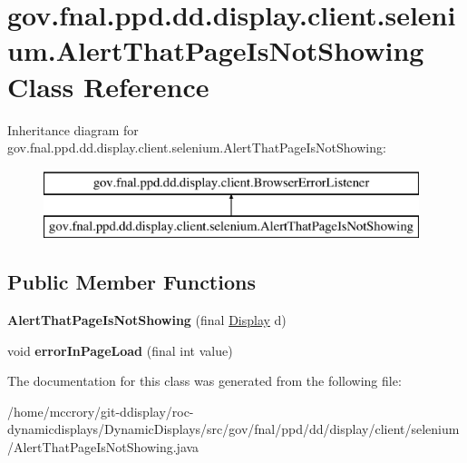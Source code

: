 \hypertarget{classgov_1_1fnal_1_1ppd_1_1dd_1_1display_1_1client_1_1selenium_1_1AlertThatPageIsNotShowing}{\section{gov.\-fnal.\-ppd.\-dd.\-display.\-client.\-selenium.\-Alert\-That\-Page\-Is\-Not\-Showing Class Reference}
\label{classgov_1_1fnal_1_1ppd_1_1dd_1_1display_1_1client_1_1selenium_1_1AlertThatPageIsNotShowing}
}
Inheritance diagram for gov.\-fnal.\-ppd.\-dd.\-display.\-client.\-selenium.\-Alert\-That\-Page\-Is\-Not\-Showing\-:\begin{figure}[H]
\begin{center}
\leavevmode
\includegraphics[height=2.000000cm]{classgov_1_1fnal_1_1ppd_1_1dd_1_1display_1_1client_1_1selenium_1_1AlertThatPageIsNotShowing}
\end{center}
\end{figure}
\subsection*{Public Member Functions}
\begin{DoxyCompactItemize}
\item 
\hypertarget{classgov_1_1fnal_1_1ppd_1_1dd_1_1display_1_1client_1_1selenium_1_1AlertThatPageIsNotShowing_a4f9d56ae893432d34ccce59a15af49c1}{{\bfseries Alert\-That\-Page\-Is\-Not\-Showing} (final \hyperlink{interfacegov_1_1fnal_1_1ppd_1_1dd_1_1signage_1_1Display}{Display} d)}\label{classgov_1_1fnal_1_1ppd_1_1dd_1_1display_1_1client_1_1selenium_1_1AlertThatPageIsNotShowing_a4f9d56ae893432d34ccce59a15af49c1}

\item 
\hypertarget{classgov_1_1fnal_1_1ppd_1_1dd_1_1display_1_1client_1_1selenium_1_1AlertThatPageIsNotShowing_a2830890a7364d6ce4a328cda1a784fa0}{void {\bfseries error\-In\-Page\-Load} (final int value)}\label{classgov_1_1fnal_1_1ppd_1_1dd_1_1display_1_1client_1_1selenium_1_1AlertThatPageIsNotShowing_a2830890a7364d6ce4a328cda1a784fa0}

\end{DoxyCompactItemize}


The documentation for this class was generated from the following file\-:\begin{DoxyCompactItemize}
\item 
/home/mccrory/git-\/ddisplay/roc-\/dynamicdisplays/\-Dynamic\-Displays/src/gov/fnal/ppd/dd/display/client/selenium/Alert\-That\-Page\-Is\-Not\-Showing.\-java\end{DoxyCompactItemize}
